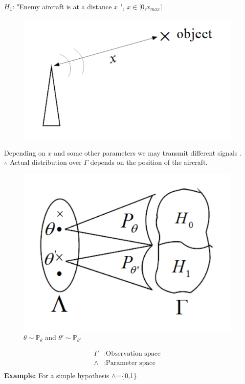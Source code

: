 \documentclass[12pt]{report}
\begin{document}
$H_1$: "Enemy aircraft is at a distance $x$ ", $x$$\in$[0,$x_{max}$]\\
\begin{figure}[h]
\centering
\includegraphics[scale=0.5]{Figures/radfig_snip}
\end{figure}
Depending on $x$ and some other parameters we may transmit different signals . \\
$\therefore$ Actual distribution over $\Gamma$ depends on the position of the aircraft.\\
\begin{figure}[h]
\centering
\includegraphics[scale=0.75]{Figures/fig2_snipp}
\caption{$\theta\sim\mathbb{P}_{\theta}$ and $\theta'\sim\mathbb{P}_{\theta'}$ }
\end{figure}
\begin{align*}
\Gamma&: \text{Observation space}\\
\wedge&: \text{Parameter space}\\[-10pt]
\end{align*}
\textbf{Example:} For a simple hypothesis $\wedge$=\{0,1\}\\[-15pt]
\end{document}
